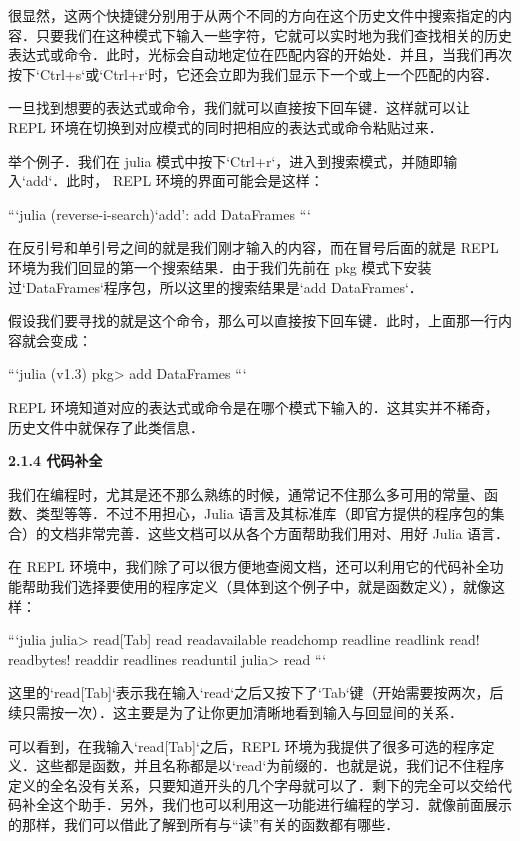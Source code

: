 很显然，这两个快捷键分别用于从两个不同的方向在这个历史文件中搜索指定的内容．只要我们在这种模式下输入一些字符，它就可以实时地为我们查找相关的历史表达式或命令．此时，光标会自动地定位在匹配内容的开始处．并且，当我们再次按下`Ctrl+s`或`Ctrl+r`时，它还会立即为我们显示下一个或上一个匹配的内容．

一旦找到想要的表达式或命令，我们就可以直接按下回车键．这样就可以让 REPL 环境在切换到对应模式的同时把相应的表达式或命令粘贴过来．

举个例子．我们在 julia 模式中按下`Ctrl+r`，进入到搜索模式，并随即输入`add`．此时， REPL 环境的界面可能会是这样：

```julia
(reverse-i-search)`add': add DataFrames
```

在反引号和单引号之间的就是我们刚才输入的内容，而在冒号后面的就是 REPL 环境为我们回显的第一个搜索结果．由于我们先前在 pkg 模式下安装过`DataFrames`程序包，所以这里的搜索结果是`add DataFrames`．

假设我们要寻找的就是这个命令，那么可以直接按下回车键．此时，上面那一行内容就会变成：

```julia
(v1.3) pkg> add DataFrames
```

REPL 环境知道对应的表达式或命令是在哪个模式下输入的．这其实并不稀奇，历史文件中就保存了此类信息．

\textbf{2.1.4 代码补全}

我们在编程时，尤其是还不那么熟练的时候，通常记不住那么多可用的常量、函数、类型等等．不过不用担心，Julia 语言及其标准库（即官方提供的程序包的集合）的文档非常完善．这些文档可以从各个方面帮助我们用对、用好 Julia 语言．

在 REPL 环境中，我们除了可以很方便地查阅文档，还可以利用它的代码补全功能帮助我们选择要使用的程序定义（具体到这个例子中，就是函数定义），就像这样：

```julia
julia> read[Tab]
read          readavailable  readchomp      readline       readlink
read!         readbytes!     readdir        readlines      readuntil
julia> read
```

这里的`read[Tab]`表示我在输入`read`之后又按下了`Tab`键（开始需要按两次，后续只需按一次）．这主要是为了让你更加清晰地看到输入与回显间的关系．

可以看到，在我输入`read[Tab]`之后，REPL 环境为我提供了很多可选的程序定义．这些都是函数，并且名称都是以`read`为前缀的．也就是说，我们记不住程序定义的全名没有关系，只要知道开头的几个字母就可以了．剩下的完全可以交给代码补全这个助手．另外，我们也可以利用这一功能进行编程的学习．就像前面展示的那样，我们可以借此了解到所有与“读”有关的函数都有哪些．

